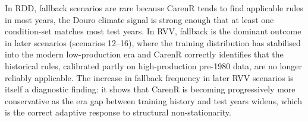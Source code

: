 In RDD, fallback scenarios are rare because CarenR tends to find applicable rules in most years, the Douro climate signal is strong enough that at least one condition-set matches most test years. In RVV, fallback is the dominant outcome in later scenarios (scenarios 12--16), where the training distribution has stabilised into the modern low-production era and CarenR correctly identifies that the historical rules, calibrated partly on high-production pre-1980 data, are no longer reliably applicable. The increase in fallback frequency in later RVV scenarios is itself a diagnostic finding: it shows that CarenR is becoming progressively more conservative as the era gap between training history and test years widens, which is the correct adaptive response to structural non-stationarity.

